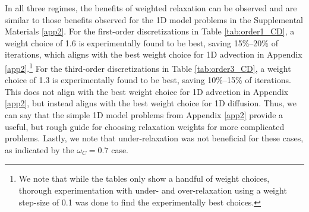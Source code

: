\documentclass[VANCOUVER,STIX1COL]{WileyNJD-v2}
\makeatletter
\newcommand{\bs}[1]{\textcolor{magenta}{[BS\@: #1]}}
\makeatother
\begin{document}
In all three regimes, the benefits of weighted relaxation can be observed and
are similar to those benefits observed for the 1D model problems in the Supplemental 
Materials \ref{app2}. 
For the first-order discretizations in Table 
\ref{tab:order1_CD}, a weight choice of 1.6 is experimentally found to be best, saving
15\%--20\% of iterations, which aligns with the best weight choice for 1D advection in 
Appendix \ref{app2}.\footnote{We note that while the tables only show
a handful of weight choices, thorough experimentation with under- and over-relaxation using a weight step-size of 0.1 was done to find the experimentally best 
choices.  } For the third-order discretizations in Table \ref{tab:order3_CD}, a weight choice 
of 1.3 is  experimentally found to be best, saving 10\%--15\% of iterations.  This does not 
align with  the best weight choice for 1D advection in Appendix \ref{app2}, but instead  
aligns with the best weight choice for 1D diffusion.  Thus, we can say that the simple 1D 
model problems from Appendix \ref{app2} provide a useful, but rough guide for choosing 
relaxation weights for more complicated problems.  Lastly, we note that under-relaxation was 
not beneficial for these cases, as indicated by the $\omega_C = 0.7$ case.
\end{document}

